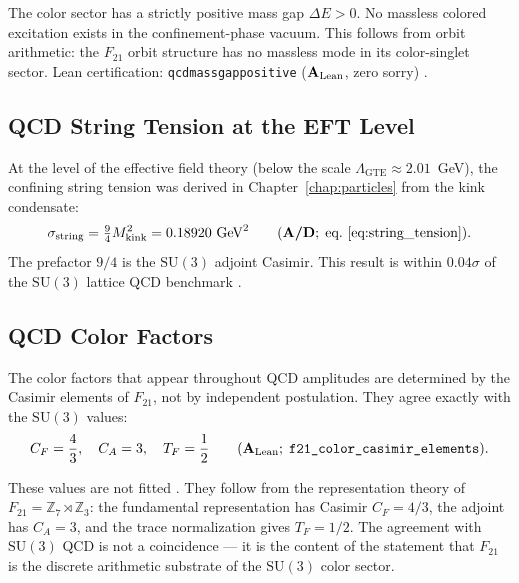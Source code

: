 \documentclass[11pt,openany]{book}
\theoremstyle{remark}
\newcommand{\GTE}{\text{GTE}}
\newcommand{\ZS}{\mathbb{Z}_7}
\newcommand{\lean}[1]{%
  \penalty-100
  \begingroup\def\_{\textunderscore\allowbreak}\texttt{#1}\endgroup}
\newcommand{\Mkink}{M_{\rm kink}}
\newcommand{\CatAL}{\ensuremath{\textbf{A}_{\rm Lean}}}
\newcommand{\CatAD}{\textbf{A/D}}
\begin{document}
\begin{tcolorbox}[colback=orange!5,colframe=orange!60,title={Result: QCD Mass Gap (\CatAL)}]
The \GTE{} color sector has a strictly positive mass gap $\Delta E > 0$.  No massless
colored excitation exists in the confinement-phase vacuum.  This follows from orbit
arithmetic: the $F_{21}$ orbit structure has no massless mode in its color-singlet sector.
Lean certification: \lean{qcd\_mass\_gap\_positive} (\CatAL, zero sorry)
\cite{SpivackGTEQCDStructure}.
\end{tcolorbox}

\subsection*{QCD String Tension at the EFT Level}

At the level of the \GTE{} effective field theory (below the scale $\Lambda_{\GTE} \approx
2.01$~GeV), the confining string tension was derived in Chapter~\ref{chap:particles}
from the kink condensate:
\begin{equation}
  \sigma_{\rm string} = \tfrac{9}{4} \Mkink^2 = 0.18920~\text{GeV}^2 \qquad
  (\CatAD;\;\text{eq.}~\eqref{eq:string_tension}).
  \label{eq:string_tension_ref}
\end{equation}
The prefactor $9/4$ is the $\mathrm{SU}(3)$ adjoint Casimir.  This result is within
$0.04\sigma$ of the $\mathrm{SU}(3)$ lattice QCD benchmark \cite{SpivackGTEQCDStructure}.

\subsection*{QCD Color Factors}

The color factors that appear throughout QCD amplitudes are determined by the Casimir
elements of $F_{21}$, not by independent postulation.  They agree exactly with the
$\mathrm{SU}(3)$ values:
\begin{equation}
  C_F = \frac{4}{3}, \quad C_A = 3, \quad T_F = \frac{1}{2}
  \qquad (\CatAL;\;\lean{f21\_color\_casimir\_elements}).
\end{equation}

These values are not fitted \cite{SpivackGTEQCDStructure}.  They follow from the representation theory of $F_{21} =
\ZS \rtimes \mathbb{Z}_3$: the fundamental representation has Casimir $C_F = 4/3$, the
adjoint has $C_A = 3$, and the trace normalization gives $T_F = 1/2$.  The agreement with
$\mathrm{SU}(3)$ QCD is not a coincidence --- it is the content of the \GTE{} statement
that $F_{21}$ is the discrete arithmetic substrate of the $\mathrm{SU}(3)$ color sector.
\end{document}
